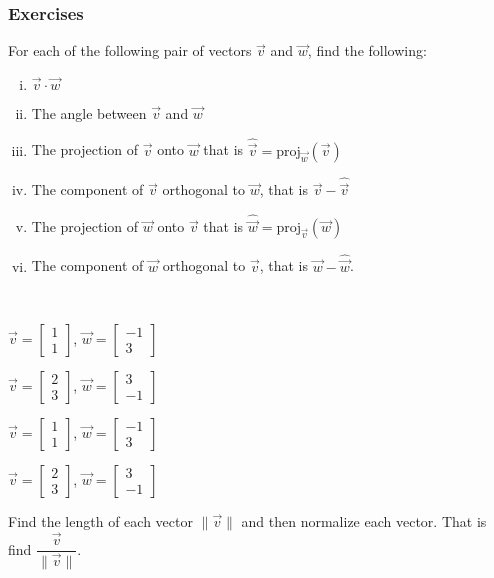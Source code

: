 \subsubsection{Exercises}
\begin{exercise}
For each of the following pair of vectors $\vec{v}$ and $\vec{w}$, find the following:
\begin{enumerate}[i.]
\item $\vec{v}\cdot \vec{w}$
\item The angle between $\vec{v}$ and $\vec{w}$
\item The projection of $\vec{v}$ onto $\vec{w}$ that is $\hat{\vec{v}}=\text{proj}_\vec{w}(\vec{v})$
\item The component of $\vec{v}$ orthogonal to $\vec{w}$, that is $\vec{v}-\hat{\vec{v}}$
\item The projection of $\vec{w}$ onto $\vec{v}$ that is $\hat{\vec{w}}=\text{proj}_\vec{v}(\vec{w})$
\item The component of $\vec{w}$ orthogonal to $\vec{v}$, that is $\vec{w}-\hat{\vec{w}}$.
\end{enumerate}\\
\begin{inparaenum}[a)]
\item $\vec{v}=\begin{bmatrix}1 \\ 1 \end{bmatrix}$, $\vec{w}=\begin{bmatrix}-1 \\ 3 \end{bmatrix}$ \hfill
\item $\vec{v}=\begin{bmatrix}2 \\ 3 \end{bmatrix}$, $\vec{w}=\begin{bmatrix} 3 \\ -1 \end{bmatrix}$ \hfill {} \\
\item $\vec{v}=\begin{bmatrix}1 \\ 1 \end{bmatrix}$, $\vec{w}=\begin{bmatrix}-1 \\ 3 \end{bmatrix}$ \hfill
\item $\vec{v}=\begin{bmatrix}2 \\ 3 \end{bmatrix}$, $\vec{w}=\begin{bmatrix} 3 \\ -1 \end{bmatrix}$ \hfill {} \\
\end{inparaenum}
\end{exercise}

\begin{exercise}
Find the length of each vector $\|\vec{v}\|$ and then normalize each vector. That is find $\dfrac{\vec{v}}{\|\vec{v}\|}$.

\end{exercise}

